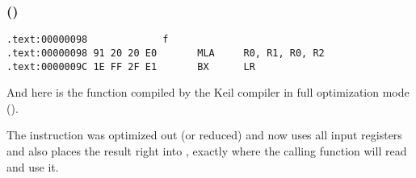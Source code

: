 ﻿\subsubsection{\OptimizingKeilVI (\ARMMode)}

\begin{lstlisting}[label=ARM_leaf_example1,style=customasmARM]
.text:00000098             f
.text:00000098 91 20 20 E0       MLA     R0, R1, R0, R2
.text:0000009C 1E FF 2F E1       BX      LR
\end{lstlisting}


And here is the \ttf function compiled by the Keil compiler in full optimization mode (\Othree).

The \MOV instruction was optimized out (or reduced) and now  uses all 
input registers and also places the result right into ,
exactly where the calling function will read and use it.
